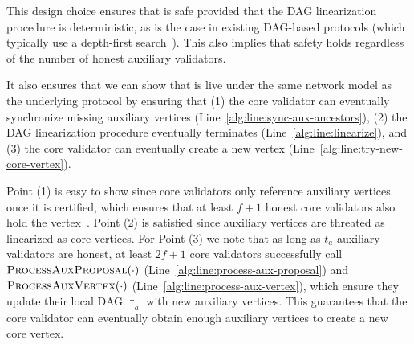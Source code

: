 This design choice ensures that \sysname is safe provided that the DAG linearization procedure is deterministic, as is the case in existing DAG-based protocols (which typically use a depth-first search~\cite{dag-rider}). This also implies that safety holds regardless of the number of honest auxiliary validators.

It also ensures that we can show that \sysname is live under the same network model as the underlying protocol by ensuring that (1) the core validator can eventually synchronize missing auxiliary vertices (Line~\ref{alg:line:sync-aux-ancestors}), (2) the DAG linearization procedure eventually terminates (Line~\ref{alg:line:linearize}), and (3) the core validator can eventually create a new vertex (Line~\ref{alg:line:try-new-core-vertex}).

Point (1) is easy to show since core validators only reference auxiliary vertices once it is certified, which ensures that at least $f+1$ honest core validators also hold the vertex~\cite{cachin2011introduction}. Point (2) is satisfied since auxiliary vertices are threated as linearized as core vertices. For Point (3) we note that as long as $t_a$ auxiliary validators are honest, at least $2f+1$ core validators successfully call $\Call{ProcessAuxProposal}{\cdot}$ (Line~\ref{alg:line:process-aux-proposal}) and $\Call{ProcessAuxVertex}{\cdot}$ (Line~\ref{alg:line:process-aux-vertex}), which ensure they update their local DAG $\dag_a$ with new auxiliary vertices. This guarantees that the core validator can eventually obtain enough auxiliary vertices to create a new core vertex.